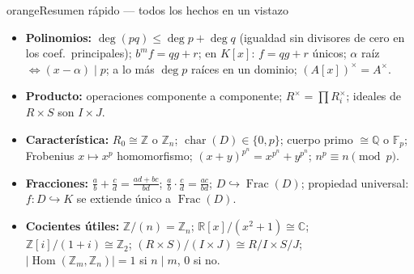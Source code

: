 \documentclass[11pt,twoside]{article}
\DeclareMathOperator{\Hom}{Hom}
\DeclareMathOperator{\Frac}{Frac}
\DeclareMathOperator{\Char}{char}
\newcommand{\Z}{\mathbb{Z}}
\newcommand{\R}{\mathbb{R}}
\newcommand{\Q}{\mathbb{Q}}
\newcommand{\C}{\mathbb{C}}
\newcommand{\F}{\mathbb{F}}
\begin{document}
\begin{equivbox}{orange}{Resumen rápido --- todos los hechos en un vistazo}
\begin{itemize}[leftmargin=2em]
\item \textbf{Polinomios:} $\deg(pq) \leq \deg p + \deg q$ (igualdad sin divisores de cero en los coef.\ principales); $b^{m} f = qg + r$; en $K[x]$: $f = qg + r$ únicos; $\alpha$ raíz $\iff (x - \alpha) \mid p$; a lo más $\deg p$ raíces en un dominio; $(A[x])^{\times} = A^{\times}$.
\item \textbf{Producto:} operaciones componente a componente; $R^{\times} = \prod R_{i}^{\times}$; ideales de $R \times S$ son $I \times J$.
\item \textbf{Característica:} $R_{0} \cong \Z$ o $\Z_{n}$; $\Char(D) \in \{0, p\}$; cuerpo primo $\cong \Q$ o $\F_{p}$; Frobenius $x \mapsto x^{p}$ homomorfismo; $(x+y)^{p^{n}} = x^{p^{n}} + y^{p^{n}}$; $n^{p} \equiv n \pmod p$.
\item \textbf{Fracciones:} $\frac{a}{b} + \frac{c}{d} = \frac{ad+bc}{bd}$; $\frac{a}{b} \cdot \frac{c}{d} = \frac{ac}{bd}$; $D \hookrightarrow \Frac(D)$; propiedad universal: $f : D \hookrightarrow K$ se extiende único a $\Frac(D)$.
\item \textbf{Cocientes útiles:} $\Z/(n) = \Z_{n}$; $\R[x]/(x^{2}+1) \cong \C$; $\Z[i]/(1+i) \cong \Z_{2}$; $(R \times S)/(I \times J) \cong R/I \times S/J$; $|\Hom(\Z_{m}, \Z_{n})| = 1$ si $n \mid m$, $0$ si no.
\end{itemize}
\end{equivbox}
\end{document}
